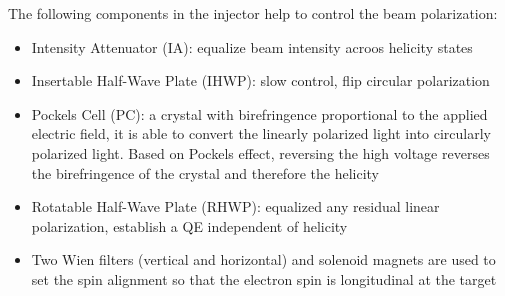 \begin{figure}[h!]
\end{figure}
\begin{comment}
    1. what's the beam polarization before the Pockels cell? linearly or circularly
    polarized?
\end{comment}

The following components in the injector help to control the beam polarization:
\begin{itemize}
    \item Intensity Attenuator (IA): equalize beam intensity acroos helicity states
    \item Insertable Half-Wave Plate (IHWP): slow control, flip circular polarization
    \item Pockels Cell (PC): a crystal with birefringence proportional to the applied
	electric field, it is able to convert the linearly polarized light into
	circularly polarized light. Based on Pockels effect, reversing the high voltage reverses
	the birefringence of the crystal and therefore the helicity
    \item Rotatable Half-Wave Plate (RHWP): equalized any residual linear polarization,
	establish a QE independent of helicity
    \item Two Wien filters (vertical and horizontal) and solenoid magnets are 
	used to set the spin alignment so that the electron spin is longitudinal 
	at the target
\end{itemize}

